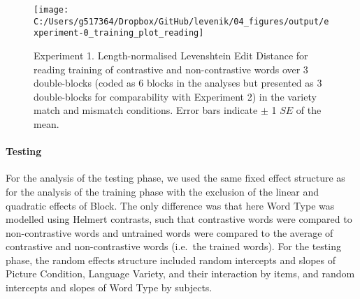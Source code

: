 \documentclass[doc,floatsintext]{apa6}
\let\oldparagraph\paragraph
\renewcommand{\paragraph}[1]{\oldparagraph{#1}\mbox{}}
\begin{document}
\begin{figure}[htb]

{\centering \texttt{[image: C:/Users/g517364/Dropbox/GitHub/levenik/04\_figures/output/experiment-0\_training\_plot\_reading]} 

}

\caption{Experiment 1. Length-normalised Levenshtein Edit Distance for reading training of contrastive and non-contrastive words over 3 double-blocks (coded as 6 blocks in the analyses but presented as 3 double-blocks for comparability with Experiment 2) in the variety match and mismatch conditions. Error bars indicate $\pm$ 1 $SE$ of the mean.}\label{fig:ex0-train-plots}
\end{figure}

\paragraph{Testing}\label{testing}

For the analysis of the testing phase, we used the same fixed effect
structure as for the analysis of the training phase with the exclusion
of the linear and quadratic effects of Block. The only difference was
that here Word Type was modelled using Helmert contrasts, such that
contrastive words were compared to non-contrastive words and untrained
words were compared to the average of contrastive and non-contrastive
words (i.e.~the trained words). For the testing phase, the random
effects structure included random intercepts and slopes of Picture
Condition, Language Variety, and their interaction by items, and random
intercepts and slopes of Word Type by subjects.
\end{document}
